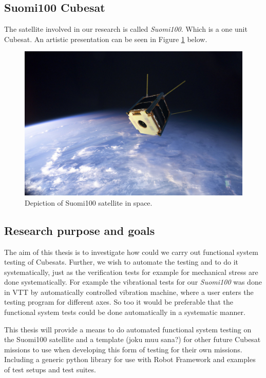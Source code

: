 \documentclass[english,12pt,a4paper,pdftex,elec,utf8]{aaltothesis}
\begin{document}
\subsection{Suomi100 Cubesat} 
The satellite involved in our research is called \textit{Suomi100}. Which is a one unit Cubesat. An artistic presentation can be seen in Figure \ref{s100intro} below.
\begin{centering}
\begin{figure}[h!]
\includegraphics[scale=0.2]{s100_orbit}
\caption{Depiction of Suomi100 satellite in space.}
\label{s100intro}
\end{figure} 
\end{centering}
\subsection{Research purpose and goals}
The aim of this thesis is to investigate how could we carry out
functional system testing of Cubesats. Further, we wish to automate the testing and to do it systematically, just as the verification tests for example for mechanical stress are done systematically. For example the vibrational tests for our \textit{Suomi100} was done in VTT by automatically controlled vibration machine, where a user enters the testing program for different axes. So too it would be preferable that the functional system tests could be done automatically in a systematic manner.\par 
This thesis will provide a means to do automated functional system testing on the Suomi100 satellite and a template (joku muu sana?) for other future Cubesat missions to use when developing this form of testing for their own missions. Including a generic python library for use with Robot Framework and examples of test setups and test suites. 
\end{document}
